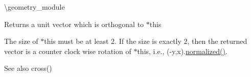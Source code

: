 \textbackslash{}geometry\+\_\+module

\begin{DoxyReturn}{Returns}
a unit vector which is orthogonal to {\ttfamily $\ast$this} 
\end{DoxyReturn}
The size of {\ttfamily $\ast$this} must be at least 2. If the size is exactly 2, then the returned vector is a counter clock wise rotation of {\ttfamily $\ast$this}, i.\+e., (-\/y,x).\mbox{\hyperlink{class_eigen_1_1_matrix_base_a6ede5c8ebe9631fed9004fedbf9e4016}{normalized()}}.

\begin{DoxySeeAlso}{See also}
cross() 
\end{DoxySeeAlso}
